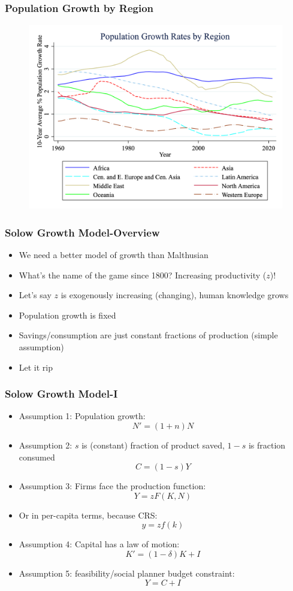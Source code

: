 \documentclass{beamer}
\begin{document}
\begin{frame}
\frametitle[alignment=center]{Population Growth by Region}
\begin{figure}
\centering
\includegraphics[scale=0.25]{Figures/PopGrowth_region.png}
\end{figure}
\end{frame}

\begin{frame}
\frametitle[alignment=center]{Solow Growth Model-Overview}
\begin{itemize}
\item We need a better model of growth than Malthusian
\bigskip
\item What's the name of the game since 1800?  Increasing productivity ($z$)!
\bigskip
\item Let's say $z$ is exogenously increasing (changing), human knowledge grows
\bigskip
\item Population growth is fixed
\bigskip
\item Savings/consumption are just constant fractions of production  (simple assumption)
\bigskip
\item Let it rip
\end{itemize}
\end{frame}


\begin{frame}
\frametitle[alignment=center]{Solow Growth Model-I}
\begin{itemize}
\item Assumption 1: Population growth:
$$N'=(1+n)N$$
\item Assumption 2: $s$ is (constant) fraction of product saved, $1-s$ is fraction consumed
$$C=(1-s)Y$$
\item Assumption 3: Firms face the production function:
$$Y=zF(K,N)$$
\item Or in per-capita terms, because CRS:
$$y=zf(k)$$
\item Assumption 4: Capital has a law of motion:
$$K'=(1-\delta)K+I$$
\item Assumption 5:  feasibility/social planner budget constraint:
$$Y=C+I$$
\end{itemize}
\end{frame}
\end{document}
